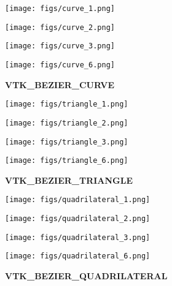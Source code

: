 \documentclass{article}
\begin{document}
\begin{center}
  \begin{minipage}{0.22\linewidth} \centering \texttt{[image: figs/curve\_1.png]} \end{minipage}
  \begin{minipage}{0.22\linewidth} \centering \texttt{[image: figs/curve\_2.png]} \end{minipage}
  \begin{minipage}{0.22\linewidth} \centering \texttt{[image: figs/curve\_3.png]} \end{minipage}
  \begin{minipage}{0.22\linewidth} \centering \texttt{[image: figs/curve\_6.png]} \end{minipage}
  {\scriptsize \textbf{VTK\_BEZIER\_CURVE}}

  \begin{minipage}{0.22\linewidth} \centering \texttt{[image: figs/triangle\_1.png]} \end{minipage}
  \begin{minipage}{0.22\linewidth} \centering \texttt{[image: figs/triangle\_2.png]} \end{minipage}
  \begin{minipage}{0.22\linewidth} \centering \texttt{[image: figs/triangle\_3.png]} \end{minipage}
  \begin{minipage}{0.22\linewidth} \centering \texttt{[image: figs/triangle\_6.png]} \end{minipage}
  {\scriptsize \textbf{VTK\_BEZIER\_TRIANGLE}}

  \begin{minipage}{0.22\linewidth} \centering \texttt{[image: figs/quadrilateral\_1.png]} \end{minipage}
  \begin{minipage}{0.22\linewidth} \centering \texttt{[image: figs/quadrilateral\_2.png]} \end{minipage}
  \begin{minipage}{0.22\linewidth} \centering \texttt{[image: figs/quadrilateral\_3.png]} \end{minipage}
  \begin{minipage}{0.22\linewidth} \centering \texttt{[image: figs/quadrilateral\_6.png]} \end{minipage}
  {\scriptsize \textbf{VTK\_BEZIER\_QUADRILATERAL}}


\end{center}
\end{document}
